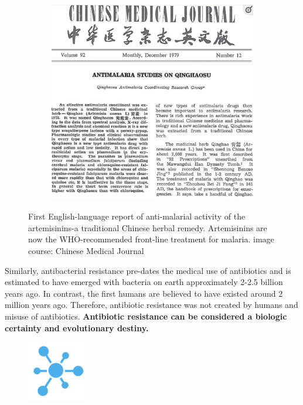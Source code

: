 \documentclass[
  letterpaper,
  DIV=11,
  numbers=noendperiod]{scrreprt}
\begin{document}
\begin{figure}

{\centering 

\begin{figure}

{\centering \includegraphics[width=5.20833in,height=\textheight]{images/chinese.png}

}

\end{figure}

}

\caption{\label{fig-chinese}First English-language report of
anti-malarial activity of the artemisinins-a traditional Chinese herbal
remedy. Artemisinins are now the WHO-recommended front-line treatment
for malaria. image course: Chinese Medical Journal}

\end{figure}

Similarly, antibacterial resistance pre-dates the medical use of
antibiotics and is estimated to have emerged with bacteria on earth
approximately 2-2.5 billion years ago. In contrast, the first humans are
believed to have existed around 2 million years ago. Therefore,
antibiotic resistance was not created by humans and misuse of
antibiotics. \textbf{Antibiotic resistance can be considered a biologic
certainty and evolutionary destiny.}

\begin{figure}

{\centering \includegraphics[width=1.04167in,height=\textheight]{images/breakblue.png}

}

\end{figure}
\end{document}
